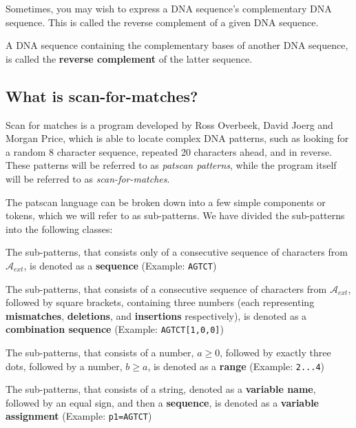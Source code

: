 \documentclass[12pt]{article}
\theoremstyle{definition}
\begin{document}
Sometimes, you may wish to express a DNA sequence's complementary DNA sequence. This is called the reverse complement of a given DNA sequence.

\begin{definition}
A DNA sequence containing the complementary bases of another DNA sequence, is called the \textbf{reverse complement} of the latter sequence.
\end{definition}

\subsection{What is scan-for-matches?}

Scan for matches is a program developed by Ross Overbeek, David Joerg and Morgan Price\cite{scan-for-matches}, which is able to locate complex DNA patterns, such as looking for a random 8 character sequence, repeated 20 characters ahead, and in reverse. These patterns will be referred to as \textit{patscan patterns}, while the program itself will be referred to as \textit{scan-for-matches}.

The patscan language can be broken down into a few simple components or tokens, which we will refer to as sub-patterns. We have divided the sub-patterns into the following classes:

\begin{definition}
The sub-patterns, that consists only of a consecutive sequence of characters from $\mathcal{A}_{ext}$, is denoted as a \textbf{sequence} (Example: \texttt{AGTCT})
\end{definition}

\begin{definition}
The sub-patterns, that consists of a consecutive sequence of characters from $\mathcal{A}_{ext}$, followed by square brackets, containing three numbers (each representing \textbf{mismatches}, \textbf{deletions}, and \textbf{insertions} respectively), is denoted as a \textbf{combination sequence} (Example: \texttt{AGTCT[1,0,0]})
\end{definition}

\begin{definition}
The sub-patterns, that consists of a number, $a \geq 0$, followed by exactly three dots, followed by a number, $b \geq a$, is denoted as a \textbf{range} (Example: \texttt{2...4})
\end{definition}

\begin{definition}
The sub-patterns, that consists of a string, denoted as a \textbf{variable name}, followed by an equal sign, and then a \textbf{sequence}, is denoted as a \textbf{variable assignment} (Example: \texttt{p1=AGTCT})
\end{definition}
\end{document}
